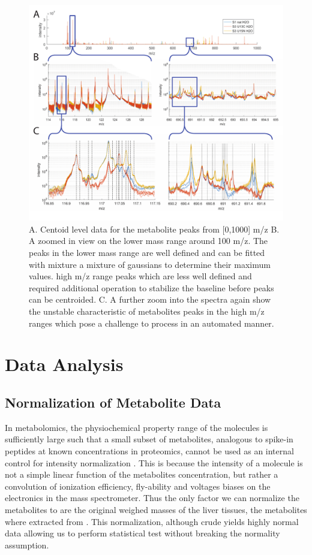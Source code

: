 \documentclass[a4paper,11pt,twoside]{book}
\begin{document}
	\begin{figure}[htb!]
		\centering
		\includegraphics[width=1.2\linewidth]{3.Metabolomics/Raw_Signal.pdf}
		\caption{A. Centoid level data for the metabolite peaks from [0,1000] m/z\newline	
			B. A zoomed in view on the lower mass range around 100 m/z. The peaks in the lower mass range are well defined and can be fitted with mixture a mixture of gaussians to determine their maximum values. high m/z range peaks which are less well defined and required additional operation to stabilize the baseline before peaks can be centroided.
			C. A further zoom into the spectra again show the unstable characteristic of metabolites peaks in the high m/z ranges which pose a challenge to process in an automated manner. }
		\label{Raw Metabolite Profiles}
	\end{figure}
	
	\section{Data Analysis}
	
	\subsection{Normalization of Metabolite Data} 
	
	In metabolomics, the physiochemical property range of the molecules is sufficiently large such that a small subset of metabolites, analogous to spike-in peptides at known concentrations in proteomics, cannot be used as an internal control for intensity normalization \citep{Valikangas2016}. This is because the intensity of a molecule is not a simple linear function of the metabolites concentration, but rather a convolution of ionization efficiency, fly-ability and voltages biases on the electronics in the mass spectrometer. Thus the only factor we can normalize the metabolites to are the original weighed masses of the liver tissues, the metabolites where extracted from \citep{Valikangas2016}. This normalization, although crude yields highly normal data allowing us to perform statistical test without breaking the normality assumption.
	
\end{document}
